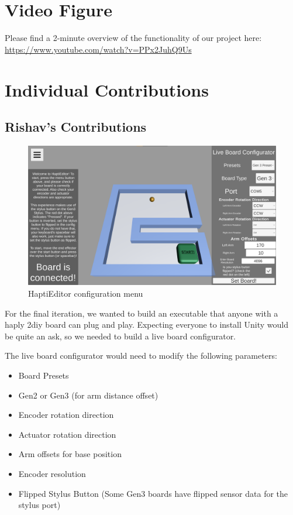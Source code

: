 \appendix

\section{Video Figure}

Please find a 2-minute overview of the functionality of our project here:\\ 
\href{https://www.youtube.com/watch?v=PPx2JuhQ9Us}{https://www.youtube.com/watch?v=PPx2JuhQ9Us}

\section{Individual Contributions}

\subsection{Rishav's Contributions}

\begin{figure}[htp]
    \centering
    \includegraphics[width=14cm]{images/appendix-menu.png}
    \caption{HaptiEditor configuration menu}
    \label{fig:menu}
\end{figure}

For the final iteration, we wanted to build an executable that anyone with a haply 2diy board can plug and play. Expecting everyone to install Unity would be quite an ask, so we needed to build a live board configurator.

The live board configurator would need to modify the following parameters:
\begin{itemize}
    \item Board Presets
    \item Gen2 or Gen3 (for arm distance offset)
    \item Encoder rotation direction
    \item Actuator rotation direction
    \item Arm offsets for base position
    \item Encoder resolution
    \item Flipped Stylus Button (Some Gen3 boards have flipped sensor data for the stylus port)
\end{itemize}

